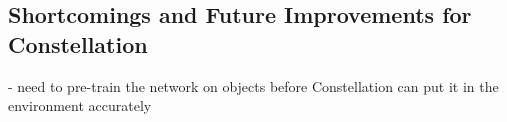 \subsection{Shortcomings and Future Improvements for Constellation}
- need to pre-train the network on objects before Constellation can put it in the environment accurately